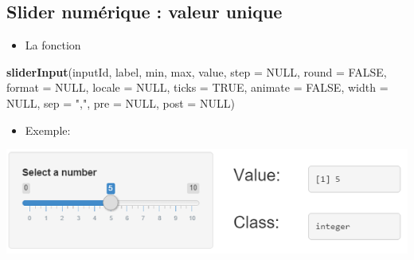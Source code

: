 \documentclass[
]{article}
\newenvironment{Shaded}{\begin{snugshade}}{\end{snugshade}}
\newcommand{\AttributeTok}[1]{\textcolor[rgb]{0.13,0.29,0.53}{#1}}
\newcommand{\CommentTok}[1]{\textcolor[rgb]{0.56,0.35,0.01}{\textit{#1}}}
\newcommand{\ConstantTok}[1]{\textcolor[rgb]{0.56,0.35,0.01}{#1}}
\newcommand{\DecValTok}[1]{\textcolor[rgb]{0.00,0.00,0.81}{#1}}
\newcommand{\FunctionTok}[1]{\textcolor[rgb]{0.13,0.29,0.53}{\textbf{#1}}}
\newcommand{\NormalTok}[1]{#1}
\newcommand{\StringTok}[1]{\textcolor[rgb]{0.31,0.60,0.02}{#1}}
\providecommand{\tightlist}{%
  \setlength{\itemsep}{0pt}\setlength{\parskip}{0pt}}
\begin{document}
\hypertarget{slider-numuxe9rique-valeur-unique}{%
\subsection{Slider numérique : valeur
unique}\label{slider-numuxe9rique-valeur-unique}}

\begin{itemize}
\tightlist
\item
  La fonction
\end{itemize}

\begin{Shaded}
\begin{Highlighting}[]
\FunctionTok{sliderInput}\NormalTok{(inputId, label, min, max, value, }\AttributeTok{step =} \ConstantTok{NULL}\NormalTok{, }\AttributeTok{round =} \ConstantTok{FALSE}\NormalTok{,}
            \AttributeTok{format =} \ConstantTok{NULL}\NormalTok{, }\AttributeTok{locale =} \ConstantTok{NULL}\NormalTok{, }\AttributeTok{ticks =} \ConstantTok{TRUE}\NormalTok{, }\AttributeTok{animate =} \ConstantTok{FALSE}\NormalTok{,}
            \AttributeTok{width =} \ConstantTok{NULL}\NormalTok{, }\AttributeTok{sep =} \StringTok{","}\NormalTok{, }\AttributeTok{pre =} \ConstantTok{NULL}\NormalTok{, }\AttributeTok{post =} \ConstantTok{NULL}\NormalTok{)}
\end{Highlighting}
\end{Shaded}

\begin{itemize}
\tightlist
\item
  Exemple:
\end{itemize}

\begin{Shaded}
\end{Shaded}

\includegraphics{img/slider.png}
\end{document}
